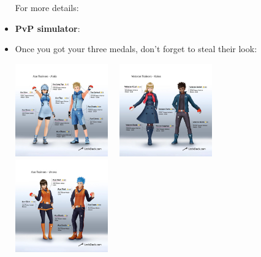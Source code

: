 \documentclass[12pt]{beamer}
\begin{document}
\begin{frame}
\begin{block}{}
\begin{footnotesize}
\begin{itemize}
 For more details: 
 \begin{center}
   \href{https://pokemongohub.net/post/pvp/getting-ready-for-pvp/}{}
   \end{center}
 


 \item \textbf{PvP simulator}: 
 
 \begin{center}
   \href{https://www.pokebattler.com}{}\quad\quad
   \href{https://pvpoke.com}{}
   \end{center}
   

\item Once you got your three medals, don't forget to steal their look:

\begin{center}
\includegraphics[width=4cm]{../../outfit/Alola_Ace_Trainer_2.jpg}~~
\includegraphics[width=4cm]{../../outfit/Kalos_Veteran_2.jpg}~~
\includegraphics[width=4cm]{../../outfit/Unova_Ace_Trainer_2.jpg}
\end{center}
\end{itemize}
\end{footnotesize}
\end{block}

\end{frame}
\end{document}
